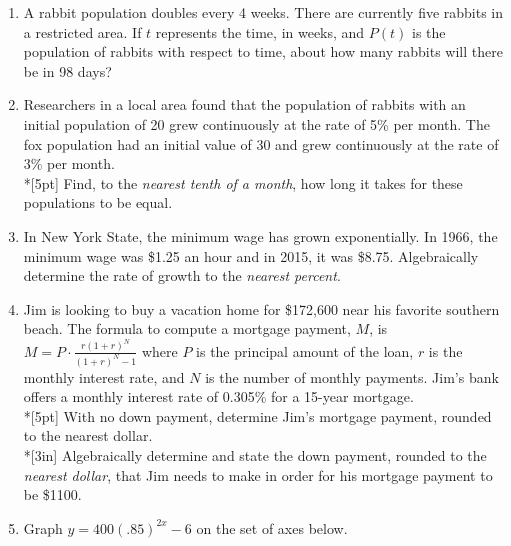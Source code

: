 \documentclass[12pt, oneside]{article}
\begin{document}
\begin{enumerate}
\item A rabbit population doubles every 4 weeks. There are currently five rabbits in a restricted area. If $t$ represents the time, in weeks, and $P(t)$ is the population of rabbits with respect to time, about how many rabbits will there be in 98 days? %

\newpage

\item Researchers in a local area found that the population of rabbits with an initial population of 20 grew continuously at the rate of 5\% per month. The fox population had an initial value of 30 and grew continuously at the rate of 3\% per month.\\*[5pt]
Find, to the \emph{nearest tenth of a month}, how long it takes for these populations to be equal. \\[3in] %

\item In New York State, the minimum wage has grown exponentially. In 1966, the minimum wage was \$1.25 an hour and in 2015, it was \$8.75. Algebraically determine the rate of growth to the \emph{nearest percent}.

\newpage

\item Jim is looking to buy a vacation home for \$172,600 near his favorite southern beach. The formula to compute a mortgage payment, $M$, is $\displaystyle M=P \cdot \frac{r(1+r)^N}{(1+r)^N-1}$ where $P$ is the principal amount of the loan, $r$ is the monthly interest rate, and $N$ is the number of monthly payments. Jim’s bank offers a monthly interest rate of 0.305\% for a 15-year mortgage.\\*[5pt]
With no down payment, determine Jim’s mortgage payment, rounded to the nearest dollar.\\*[3in]
Algebraically determine and state the down payment, rounded to the \emph{nearest dollar}, that Jim needs to make in order for his mortgage payment to be \$1100.


\newpage

\item Graph $y=400(.85)^{2x}-6$ on the set of axes below.
\begin{center}
\end{center} %


\end{enumerate}
\end{document}
